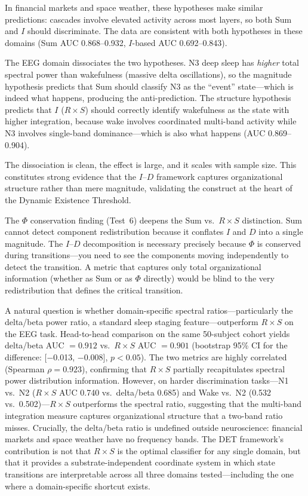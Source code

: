 \documentclass[aip,cha,reprint,amsmath,amssymb,final,floatfix]{revtex4-2}
\begin{document}
In financial markets and space weather, these hypotheses make similar predictions: cascades involve elevated activity across most layers, so both Sum and $I$ should discriminate. The data are consistent with both hypotheses in these domains (Sum AUC 0.868--0.932, $I$-based AUC 0.692--0.843).

The EEG domain dissociates the two hypotheses. N3 deep sleep has \emph{higher} total spectral power than wakefulness (massive delta oscillations), so the magnitude hypothesis predicts that Sum should classify N3 as the ``event'' state---which is indeed what happens, producing the anti-prediction. The structure hypothesis predicts that $I$ ($R \times S$) should correctly identify wakefulness as the state with higher integration, because wake involves coordinated multi-band activity while N3 involves single-band dominance---which is also what happens (AUC 0.869--0.904).

The dissociation is clean, the effect is large, and it scales with sample size. This constitutes strong evidence that the $I$--$D$ framework captures organizational structure rather than mere magnitude, validating the construct at the heart of the Dynamic Existence Threshold.

The $\Phi$ conservation finding (Test~6) deepens the Sum vs.\ $R \times S$ distinction. Sum cannot detect component redistribution because it conflates $I$ and $D$ into a single magnitude. The $I$--$D$ decomposition is necessary precisely because $\Phi$ is conserved during transitions---you need to see the components moving independently to detect the transition. A metric that captures only total organizational information (whether as Sum or as $\Phi$ directly) would be blind to the very redistribution that defines the critical transition.

A natural question is whether domain-specific spectral ratios---particularly the delta/beta power ratio, a standard sleep staging feature---outperform $R \times S$ on the EEG task. Head-to-head comparison on the same 50-subject cohort yields delta/beta AUC $= 0.912$ vs.\ $R \times S$ AUC $= 0.901$ (bootstrap 95\% CI for the difference: [$-$0.013, $-$0.008], $p < 0.05$). The two metrics are highly correlated (Spearman $\rho = 0.923$), confirming that $R \times S$ partially recapitulates spectral power distribution information. However, on harder discrimination tasks---N1 vs.\ N2 ($R \times S$ AUC 0.740 vs.\ delta/beta 0.685) and Wake vs.\ N2 (0.532 vs.\ 0.502)---$R \times S$ outperforms the spectral ratio, suggesting that the multi-band integration measure captures organizational structure that a two-band ratio misses. Crucially, the delta/beta ratio is undefined outside neuroscience: financial markets and space weather have no frequency bands. The DET framework's contribution is not that $R \times S$ is the optimal classifier for any single domain, but that it provides a substrate-independent coordinate system in which state transitions are interpretable across all three domains tested---including the one where a domain-specific shortcut exists.
\end{document}
